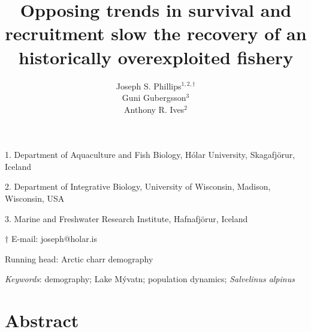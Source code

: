 \documentclass[11pt]{article}
\title{Opposing trends in survival and recruitment slow the recovery 
        of an historically overexploited fishery}
\author{
Joseph S. Phillips$^{1,2, \dagger}$ \\
Gu{\dh}ni Gu{\dh}bergsson$^{3}$ \\
Anthony R. Ives$^{2}$
}
\date{}
\begin{document}
\raggedright
\setlength\parindent{0.25in}

\maketitle


\noindent{} 1. Department of Aquaculture and Fish Biology, 
H\'{o}lar University, Skagafj\"{o}r{\dh}ur, Iceland

\noindent{} 2. Department of Integrative Biology, 
University of Wisconsin, Madison, Wisconsin, USA

\noindent{} 3. Marine and Freshwater Research Institute, Hafnafj\"{o}r{\dh}ur, Iceland

\noindent{} $\dagger$ E-mail: joseph@holar.is



\bigskip

Running head: {Arctic charr demography}

\textit{Keywords}: {demography; 
                    Lake M\'{y}vatn; 
                    population dynamics; 
                    \emph{Salvelinus alpinus}}

\clearpage






\linenumbers{}

\section*{Abstract} \label{abstract}
\end{document}
